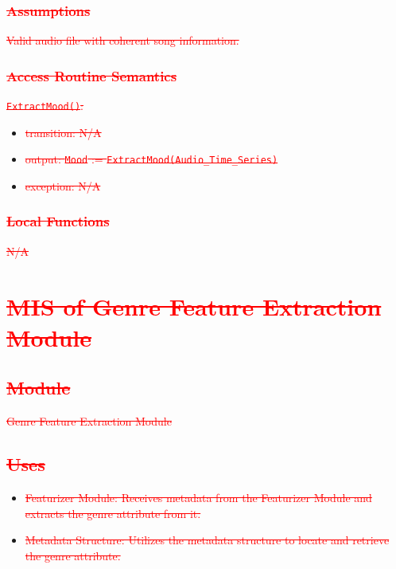 \documentclass[12pt, titlepage]{article}
\begin{document}
\subsubsection{\textcolor{red}{\sout{Assumptions}}}
\textcolor{red}{\sout{Valid audio file with coherent song information.}}

\subsubsection{\textcolor{red}{\sout{Access Routine Semantics}}}

\noindent \textcolor{red}{\sout{\texttt{ExtractMood()}:}}
\begin{itemize}
\item \textcolor{red}{\sout{transition: N/A}}
\item \textcolor{red}{\sout{output: \texttt{Mood} := \texttt{ExtractMood(Audio\_Time\_Series)}}}
\item \textcolor{red}{\sout{exception: N/A}}
\end{itemize}

\subsubsection{\textcolor{red}{\sout{Local Functions}}}
\textcolor{red}{\sout{N/A}}


\section{\textcolor{red}{\sout{MIS of Genre Feature Extraction Module}}} %

\subsection{\textcolor{red}{\sout{Module}}}
\textcolor{red}{\sout{Genre Feature Extraction Module}}

\subsection{\textcolor{red}{\sout{Uses}}}
\begin{itemize}
\item \textcolor{red}{\sout{Featurizer Module: Receives metadata from the Featurizer Module and extracts the genre attribute from it.}}
\item \textcolor{red}{\sout{Metadata Structure: Utilizes the metadata structure to locate and retrieve the genre attribute.}}
\end{itemize}
\end{document}
